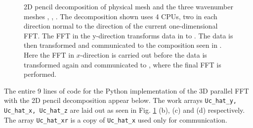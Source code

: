 \documentclass[11pt, oneside]{article}
\newcommand{\inpyth}{\lstinline[style=pythonstyle, basicstyle=\ttfamily]} %[]%
\begin{document}
\begin{figure}
{  \label{subfig2}
  }
\caption{2D pencil decomposition of physical mesh  and the three wavenumber meshes , , . The decomposition shown uses 4 CPUs, two in each direction normal to the direction of the current one-dimensional FFT. The FFT in the y-direction transforms data in  to . The data is then transformed and communicated to the composition seen in . Here the FFT in $x$-direction is carried out before the data is transformed again and communicated to , where the final FFT is performed.}
\label{fig:Pencildecomp}
\end{figure}


The entire 9 lines of code for the Python implementation of the 3D parallel FFT with the 2D pencil decomposition appear below.
The work arrays \inpyth{Uc_hat_y, Uc_hat_x, Uc_hat_z} are laid out as seen in Fig. \ref{fig:Pencildecomp} (b), (c) and (d) respectively. The array \inpyth{Uc_hat_xr} is a copy of \inpyth{Uc_hat_x} used only for communication.
\end{document}

